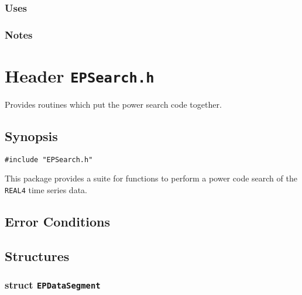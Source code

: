 \subsubsection*{Uses}

\subsubsection*{Notes}

\vfill{\footnotesize}


%
%
%
%
%
%


\newpage
\section{Header \texttt{EPSearch.h}}
\label{s:EPSearch.h}

\noindent Provides routines which put the power search code together.

\subsection*{Synopsis}
\begin{verbatim}
#include "EPSearch.h"
\end{verbatim}

\noindent This package provides a suite for functions to perform a
power code search of the \texttt{REAL4} time series data.

\subsection*{Error Conditions}


\subsection*{Structures}

\subsubsection*{struct \texttt{EPDataSegment}}

